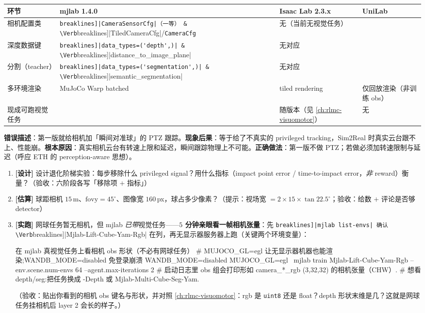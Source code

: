 \begin{center}
\small
\begin{tabular}{@{}llll@{}}
\toprule
环节 & mjlab 1.4.0 & Isaac Lab 2.3.x & UniLab \\
\midrule
相机配置类 & \Verb[breaklines]|CameraSensorCfg|（一等） & \Verb[breaklines]|TiledCameraCfg|/\allowbreak\verb|CameraCfg| & 无（当前无视觉任务） \\
深度数据键 & \Verb[breaklines]|data_types=('depth',)| & \Verb[breaklines]|distance_to_image_plane| & 无对应 \\
分割（teacher） & \Verb[breaklines]|data_types=('segmentation',)| & \Verb[breaklines]|semantic_segmentation| & 无对应 \\
多环境渲染 & MuJoCo Warp batched & tiled rendering & 仅回放渲染（非训练 obs） \\
现成可跑视觉任务 & \Verb[breaklines]|Mjlab-Lift-Cube-Yam-Rgb/-Depth| & 随版本（见 \cref{ch:rlmc-visuomotor}） & 无 \\
\bottomrule
\end{tabular}
\end{center}

\begin{pitfall}
\textbf{错误描述}：第一版就给相机加「瞬间对准球」的 PTZ 跟踪。\textbf{现象后果}：等于给了不真实的 privileged tracking，Sim2Real 时真实云台跟不上、性能崩。\textbf{根本原因}：真实相机云台有转速上限和延迟，瞬间跟踪物理上不可能。\textbf{正确做法}：第一版不做 PTZ；若做必须加转速限制与延迟（呼应 ETH 的 perception-aware 思想）。
\end{pitfall}

\begin{practice}[本节动手任务]
\begin{enumerate}
  \item \textbf{[设计]} 设计退化阶梯实验：每步移除什么 privileged signal？用什么指标（impact point error / time-to-impact error，\emph{非} reward）衡量？（验收：六阶段各写「移除项 $+$ 指标」）
  \item \textbf{[估算]} 球距相机 $15$\,m、$\mathrm{fovy}=45^\circ$、图像宽 $160$\,px，球占多少像素？（提示：视场宽 $=2\times 15\times\tan 22.5^\circ$；验收：给数 $+$ 评论是否够 detector）
  \item \textbf{[实跑]} 网球任务暂无相机，但 mjlab \emph{已带}视觉任务——\textbf{$5$ 分钟亲眼看一帧相机张量}：先 \Verb[breaklines]|mjlab list-envs| 确认 \Verb[breaklines]|Mjlab-Lift-Cube-Yam-Rgb| 在列，再无显示器服务器上跑（关键两个环境变量）：
\begin{codebox}[bash]{在 mjlab 真视觉任务上看相机 obs 形状（不必有网球任务）}
# MUJOCO_GL=egl 让无显示器机器也能渲染;WANDB_MODE=disabled 免登录崩溃
WANDB_MODE=disabled MUJOCO_GL=egl \
  mjlab train Mjlab-Lift-Cube-Yam-Rgb --env.scene.num-envs 64 --agent.max-iterations 2
# 启动日志里 obs 组会打印形如 camera_*_rgb (3,32,32) 的相机张量（CHW）.
# 想看 depth/seg:把任务换成 -Depth 或 Mjlab-Multi-Cube-Seg-Yam.
\end{codebox}
  （验收：贴出你看到的相机 obs 键名与形状，并对照 \cref{ch:rlmc-visuomotor}：rgb 是 \texttt{uint8} 还是 float？depth 形状末维是几？这就是网球任务挂相机后 layer 2 会长的样子。）
\end{enumerate}
\end{practice}


